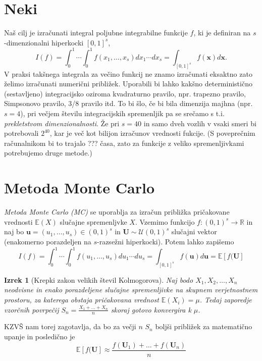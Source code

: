 \documentclass[12pt,a4paper]{amsart}
\theoremstyle{definition} %
\theoremstyle{plain} %
\newtheorem{izrek}[definicija]{Izrek}
\newcommand{\R}{\mathbb R}
\newcommand{\E}{\mathbb E}
\newcommand{\U}{\boldsymbol U}
\begin{document}
\section{Neki}
\vspace{3mm }
Naš cilj je izračunati integral poljubne integrabilne funkcije $f$, ki je definiran na $s$-dimenzionalni hiperkocki $[0,1]^s$,
\[I(f) = \int_{0}^{1}\cdots \int_{0}^{1}f(x_1,\ldots,x_s)dx_1\cdots dx_s = \int_{[0,1]^s} f(\boldsymbol x) d \boldsymbol x.
\]
V praksi takšnega integrala za večino funkcij ne znamo izračunati eksaktno zato želimo izračunati numerični približek. Uporabili bi lahko kakšno deterministično (sestavljeno) integracijsko oziroma kvadraturno pravilo, npr. trapezno pravilo, Simpsonovo pravilo, 3/8 pravilo itd. To bi šlo, če bi bila dimenzija majhna (npr. $s = 4$), pri večjem številu integracijskih spremenljik pa se srečamo s t.i. \textit{prekletstvom dimenzionalnosti}.
Že pri $s = 40$ in samo dveh vozlih v vsaki smeri bi potrebovali $2^{40}$, kar je več kot bilijon izračunov vrednosti fukcije. (S poveprečnim računalnikom bi to trajalo ??? časa, zato za funkcije z veliko spremenljivkami potrebujemo druge metode.)

\vspace{5mm}
\section{Metoda Monte Carlo}
\vspace{3mm}
\textit{Metoda Monte Carlo (MC)} se uporablja za izračun približka pričakovane vrednosti $\E(X)$ slučajne spremenljvke $X$. Vzemimo  funkcijo $f : (0,1)^s \rightarrow \R$ in naj bo $ \boldsymbol{u} 	= (u_1,\ldots,u_s) \in (0,1)^s$ in $\boldsymbol{U} \sim \mathcal{U}(0,1)^s$ slučajni vektor (enakomerno porazdeljen na $s$-razsežni hiperkocki). Potem lahko zapišemo 
\[I(f) = \int_{0}^{1}\cdots \int_{0}^{1}f(u_1,\ldots,u_s)du_1\cdots du_s = \int_{[0,1]^s} f(\boldsymbol u) d \boldsymbol u = \E[f(\boldsymbol U]
\]
\begin{izrek}[Krepki zakon velikih števil Kolmogorova]
Naj bodo $X_1,X_2,\ldots,X_n$ neodvisne in enako porazdeljene slučajne spremenljivke na skupnem verjetnostnem prostoru, za katerega obstaja pričakovana vrednost $\E(X_i) = \mu$. Tedaj zaporedje vzorčnih povrpečij $S_n = \frac{X_1 + \ldots + X_n}{n}$ skoraj gotovo konvergira k $\mu$.
\end{izrek}
KZVŠ nam torej zagotavlja, da bo za večji $n$ $S_n$ boljši približek za matematično upanje in posledično je 
\[
\E[f(\U] \approx \frac{f(\U_1) + \ldots+ f(\U_n)}{n}
\]
\vspace{2mm}
\end{document}
